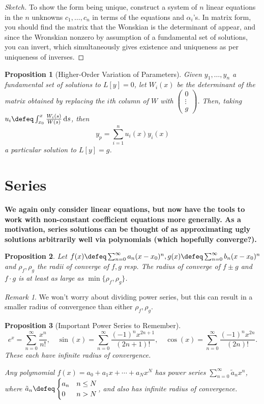 \documentclass[12pt, oneside]{article}
\theoremstyle{definition}
\theoremstyle{plain}
\newtheorem{prop}{Proposition}
\theoremstyle{remark}
\newtheorem{remark}{Remark}
\let\origsection=\section
\renewcommand\section[1]{\origsection{#1}\label{sec:\thesection}}
\begin{document}
\begin{proof}[Sketch]
  To show the form being unique, construct a system of $n$ linear equations in the $n$ unknowns $c_1, \dots, c_n$ in terms of the equations and $\alpha_i$'s. In matrix form, you should find the matrix that the Wonskian is the determinant of appear, and since the Wronskian nonzero by assumption of a fundamental set of solutions, you can invert, which simultaneously gives existence and uniqueness as per uniqueness of inverses.
\end{proof}

\begin{prop}[Higher-Order Variation of Parameters]
  Given $y_1, \dots, y_n$ a fundamental set of solutions to $L[y] = 0$, let $W_i(x)$ be the determinant of the matrix obtained by replacing the $i$th column of $W$ with $\begin{pmatrix}
    0 \\
    \vdots\\
    g
  \end{pmatrix}$. Then, taking $u_i \defeq \int_{x_0}^x \frac{W_i(s)}{W(s)} \dd{s}$, then \[
  y_p = \sum_{i=1}^n u_i(x) y_i(x)  
  \]
  a particular solution to $L[y] = g$.
\end{prop}

\section{Series}
\textbf{We again only consider linear equations, but now have the tools to work with non-constant coefficient equations more generally. As a motivation, series solutions can be thought of as approximating ugly solutions arbitrarily well via polynomials (which hopefully converge?).}

\begin{prop}
  Let $f(x) \defeq \sum_{n=0}^\infty a_n(x -x_0)^n, g(x) \defeq \sum_{n=0}^\infty b_n ( x - x_0) ^n$ and $\rho_f, \rho_g$ the radii of converge of $f, g$ resp. The radius of converge of $f \pm g$ and $f \cdot g$ is at least as large as $\min \{\rho_f, \rho_g\}$.
\end{prop}

\begin{remark}
  We won't worry about dividing power series, but this can result in a smaller radius of convergence than either $\rho_f, \rho_g$.
\end{remark}

\begin{prop}[Important Power Series to Remember]
  \[
  e^x = \sum_{n=0}^\infty \frac{x^n}{n!}, \quad \sin(x) = \sum_{n=0}^\infty \frac{(-1)^n x^{2n+1}}{(2n+1)!}, \quad \cos(x) = \sum_{n=0}^\infty \frac{(-1)^n x^{2n}}{(2n)!}.
  \]
  These each have infinite radius of convergence. 

  Any polymomial $f(x) = a_0 + a_1 x + \cdots + a_N x^N$ has power series $\sum_{n=0}^\infty \tilde{a}_n x^n$, where $\tilde{a}_n \defeq \begin{cases}
    a_n & n \leq N\\
    0 & n > N
  \end{cases}$, and also has infinite radius of convergence.
\end{prop}
\end{document}
